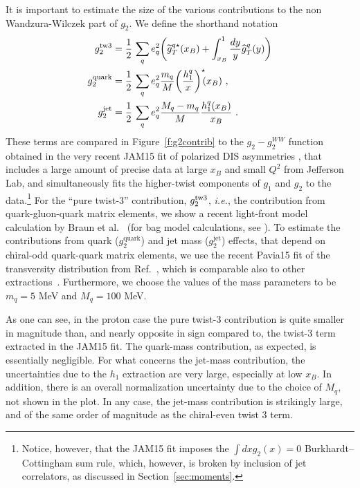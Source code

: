 \documentclass[preprintnumbers,floatfix,nofootinbib]{revtex4}
\newcommand{\xbj}{{x_B}}                   %
\newcommand{\mj}{M_q}
\newcommand{\mq}{m_q}
\begin{document}
It is important to estimate the size of the various contributions to the non Wandzura-Wilczek part of $g_2$. We define the shorthand notation
\begin{align}
g_2^{\rm tw3} & = \frac{1}{2}\,\sum_q e_q^2
    \biggl(
    \widetilde g_T^{q \star}(\xbj) 
    + \int_\xbj^1\frac{dy}{y} \widehat{g}_T^q(y) 
    \biggr) 
\nonumber \\ 
g_2^{\text{quark}} &= \frac{1}{2}\,\sum_q e_q^2 
 \frac{\mq}{M} \bigg( \frac{h_1^q}{x} \bigg)^\star\!\!(\xbj) \ ,
\\
g_2^{\text{jet}} &= \frac{1}{2}\,\sum_q e_q^2 
\frac{\mj-\mq}{M} \frac{h_1^q(\xbj)}{\xbj} \ .
\nonumber 
\end{align} 
These terms are compared in Figure~\ref{f:g2contrib} to the $g_2-g_2^{WW}$ function obtained in the very recent JAM15 fit of polarized DIS asymmetries
\cite{Sato:2016tuz}, that includes a large amount of precise data at large $\xbj$ and small $Q^2$ from Jefferson Lab, and simultaneously fits the higher-twist components of
$g_1$ and $g_2$ to the data.\footnote{Notice, however, that the JAM15 fit imposes the $\int dx g_2(x) =0$ Burkhardt--Cottingham sum rule, which, however, is broken by inclusion of jet correlators, as discussed in Section~\ref{sec:moments}.} For the ``pure twist-3'' contribution,
$g_2^{\rm tw3}$, {\it i.e.}, the contribution from quark-gluon-quark matrix
elements, we show a recent light-front model calculation by Braun et al.~\cite{Braun:2011aw} (for bag model calculations, see \cite{Jaffe:1990qh,Stratmann:1993aw}). To estimate the contributions
from quark ($g_2^{\text{quark}}$) and jet mass ($g_2^{\text{jet}}$) effects, that depend on chiral-odd quark-quark matrix elements, we use the recent Pavia15 fit of the
transversity distribution from Ref.~\cite{Radici:2015mwa}, which is comparable
also to other 
extractions~\cite{Anselmino:2013vqa,Kang:2015msa}. Furthermore, we choose the
values of the mass parameters to be $\mq=5$ MeV and $\mj = 100$ MeV. 

As one can see, in the proton case the pure twist-3 contribution is quite
smaller in magnitude than, and nearly opposite in sign compared to, the twist-3 term extracted in the JAM15 fit. The quark-mass contribution, as expected, is essentially negligible. 
For what concerns the jet-mass contribution, the uncertainties due to the $h_1$
extraction are very large, especially at low $\xbj$. In addition, there is an
overall normalization uncertainty due to the choice of $\mj$, not shown in the
plot. In any case, the jet-mass contribution is strikingly large, and of the same order of magnitude as the chiral-even twist 3 term.
\end{document}

